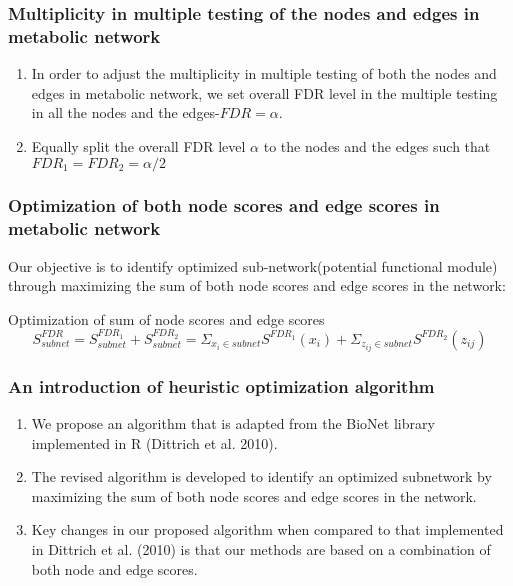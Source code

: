 \documentclass[10pt]{beamer}
\newcommand{\be}{\begin{equation}}
\newcommand{\ee}{\end{equation}}
\newcommand{\en}{\end{enumerate}}
\begin{document}
\begin{frame}[fragile]
	\frametitle{Multiplicity in multiple testing of the nodes and edges in metabolic network}
	\vspace{-2ex}
		\begin{enumerate}
			\item<1-> 
	In order to adjust the multiplicity in multiple testing of both the nodes and edges in metabolic network, we set overall FDR level in the multiple testing in all the nodes and the edges-$FDR=\alpha$.
		\vspace{3ex}
		\item<2-> Equally split the overall FDR level $\alpha$ to the nodes and the edges such that $FDR_1=FDR_2=\alpha/2$
	\en
\end{frame}



\begin{frame}[fragile]
	\frametitle{Optimization of both node scores and edge scores in metabolic network}
	Our objective is to identify optimized sub-network(potential functional module) through maximizing the sum of both node scores and edge scores in the network:
	\vspace{2ex}
\begin{block}{Optimization of sum of node scores and edge scores}
\be
\label{eq:eq11}
S^{FDR}_{subnet}=S^{FDR_1}_{subnet}+S^{FDR_2}_{subnet}=\Sigma_{x_i\in subnet}S^{FDR_1}(x_i)+\Sigma_{z_{ij}\in subnet}S^{FDR_2}(z_{ij})
\ee

\end{block} 
	
\end{frame}





\begin{frame}[fragile]
	\frametitle{An introduction of heuristic optimization algorithm}
		\begin{enumerate}
			\item<1->
 We propose an algorithm that is adapted from the BioNet library implemented in R (Dittrich et al. 2010). 
 \vspace{1ex}
 	\item<2->
 The revised algorithm is developed to identify an optimized subnetwork by maximizing the sum of both node scores and edge scores in the network. 
  \vspace{1ex}
 	\item<3->
 Key changes in our proposed algorithm when compared to that implemented in Dittrich et al. (2010) is that our methods are based on a combination of both node and edge scores.
\en
\end{frame}
\end{document}
